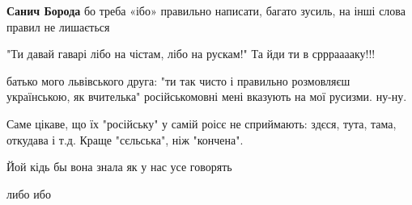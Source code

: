 \begin{itemize}
\begin{itemize}
\textbf{Санич Борода} бо треба «ібо» правильно написати, багато зусиль, на інші слова правил не лишається
\end{itemize}

 
"Ти давай гаварі лібо на чістам, лібо на рускам!"
Та йди ти в срррааааку!!!

 
батько мого львівського друга: "ти так чисто і правильно розмовляєш українською, як вчителька"
російськомовні мені вказують на мої русизми. ну-ну.

 
Саме цікаве, що їх "російську" у самій роісє не сприймають: здєся, тута, тама, откудава і т.д. Краще "сєльська", ніж "кончена".

 
Йой кідь бы вона знала як у нас усе говорять

 
либо ибо

 

\end{itemize}
